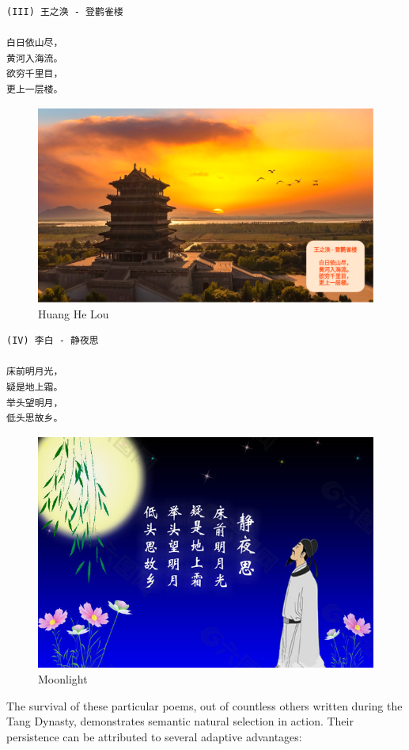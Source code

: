 \documentclass[
  11pt,
  letterpaper,
]{article}
\begin{document}
\begin{verbatim}
(III) 王之涣 - 登鹳雀楼

白日依山尽，
黄河入海流。
欲穷千里目，
更上一层楼。
\end{verbatim}

\begin{figure}
\centering
\includegraphics{./images/poem_huang-he-lou.png}
\caption{Huang He Lou}
\end{figure}

\begin{verbatim}
(IV) 李白 - 静夜思

床前明月光，
疑是地上霜。
举头望明月，
低头思故乡。
\end{verbatim}

\begin{figure}
\centering
\includegraphics{./images/poem_moonlight.jpg}
\caption{Moonlight}
\end{figure}

The survival of these particular poems, out of countless others written
during the Tang Dynasty, demonstrates semantic natural selection in
action. Their persistence can be attributed to several adaptive
advantages:
\end{document}
